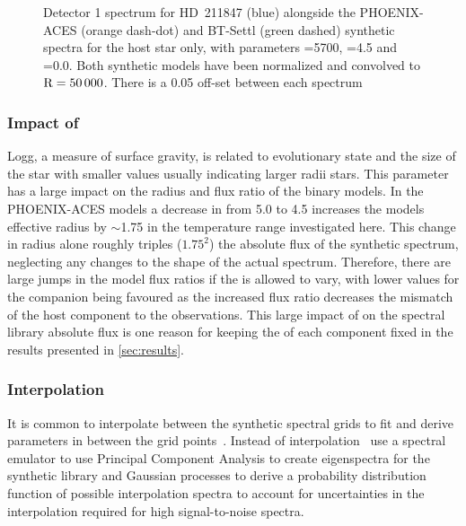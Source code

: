 \begin{figure}
    \centering
    \caption{Detector 1 spectrum for {HD~211847} (blue) alongside the {PHOENIX-ACES} (orange dash-dot) and {BT-Settl} (green dashed) synthetic spectra for the host star only, with parameters \Teff{}=5700\K{}, \logg{}=4.5 and \feh{}=0.0.
        Both synthetic models have been normalized and convolved to \(\rm R=50\,000\).
        There is a 0.05 off-set between each spectrum}
    \label{fig:hd211847-models}
\end{figure}


\subsubsection{Impact of \logg{}}
\label{subsubsec:logg}
Logg, a measure of surface gravity, is related to evolutionary state and the size of the star with smaller \logg{} values usually indicating larger radii stars.
This parameter has a large impact on the radius and flux ratio of the binary models.
In the {PHOENIX-ACES} models a decrease in \logg{} from 5.0 to 4.5 increases the models effective radius by \(\sim\)1.75 in the temperature range investigated here.
This change in radius alone roughly triples (\(1.75^2\)) the absolute flux of the synthetic spectrum, neglecting any changes to the shape of the actual spectrum.
Therefore, there are large jumps in the model flux ratios if the \logg{} is allowed to vary, with lower \logg{} values for the companion being favoured as the increased flux ratio decreases the mismatch of the host component to the observations.
This large impact of \logg{} on the spectral library absolute flux is one reason for keeping the \logg{} of each component fixed in the \textchisquared{} results presented in \cref{sec:results}.

\subsubsection{Interpolation}
\label{subsubsec:interpolation}
It is common to interpolate between the synthetic spectral grids to fit and derive parameters in between the grid points~\citep[e.g.][]{nemravova_xtauri_2016, passegger_fundamental_2016}.
Instead of interpolation~\cite{czekala_constructing_2015} use a spectral emulator to use Principal Component Analysis to create eigenspectra for the synthetic library and Gaussian processes to derive a probability distribution function of possible interpolation spectra to account for uncertainties in the interpolation required for high signal-to-noise spectra.

